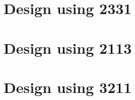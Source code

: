 
 \begin{center}




 \end{center}



\section{Design using 2331}


 \begin{center}




 \end{center}



\section{Design using 2113}


 \begin{center}




 \end{center}



\section{Design using 3211}


